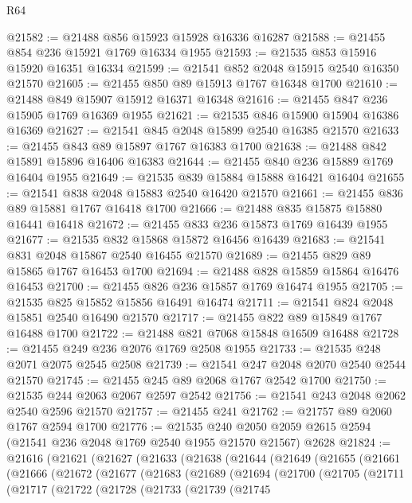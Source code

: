 \begin{lexlean}{R64}
\begin{coremodule}
@21582 := @21488 @856 @15923 @15928 @16336 @16287
@21588 := @21455 @854 @236 @15921 @1769 @16334 @1955
@21593 := @21535 @853 @15916 @15920 @16351 @16334
@21599 := @21541 @852 @2048 @15915 @2540 @16350 @21570
@21605 := @21455 @850 @89 @15913 @1767 @16348 @1700
@21610 := @21488 @849 @15907 @15912 @16371 @16348
@21616 := @21455 @847 @236 @15905 @1769 @16369 @1955
@21621 := @21535 @846 @15900 @15904 @16386 @16369
@21627 := @21541 @845 @2048 @15899 @2540 @16385 @21570
@21633 := @21455 @843 @89 @15897 @1767 @16383 @1700
@21638 := @21488 @842 @15891 @15896 @16406 @16383
@21644 := @21455 @840 @236 @15889 @1769 @16404 @1955
@21649 := @21535 @839 @15884 @15888 @16421 @16404
@21655 := @21541 @838 @2048 @15883 @2540 @16420 @21570
@21661 := @21455 @836 @89 @15881 @1767 @16418 @1700
@21666 := @21488 @835 @15875 @15880 @16441 @16418
@21672 := @21455 @833 @236 @15873 @1769 @16439 @1955
@21677 := @21535 @832 @15868 @15872 @16456 @16439
@21683 := @21541 @831 @2048 @15867 @2540 @16455 @21570
@21689 := @21455 @829 @89 @15865 @1767 @16453 @1700
@21694 := @21488 @828 @15859 @15864 @16476 @16453
@21700 := @21455 @826 @236 @15857 @1769 @16474 @1955
@21705 := @21535 @825 @15852 @15856 @16491 @16474
@21711 := @21541 @824 @2048 @15851 @2540 @16490 @21570
@21717 := @21455 @822 @89 @15849 @1767 @16488 @1700
@21722 := @21488 @821 @7068 @15848 @16509 @16488
@21728 := @21455 @249 @236 @2076 @1769 @2508 @1955
@21733 := @21535 @248 @2071 @2075 @2545 @2508
@21739 := @21541 @247 @2048 @2070 @2540 @2544 @21570
@21745 := @21455 @245 @89 @2068 @1767 @2542 @1700
@21750 := @21535 @244 @2063 @2067 @2597 @2542
@21756 := @21541 @243 @2048 @2062 @2540 @2596 @21570
@21757 := @21455 @241
@21762 := @21757 @89 @2060 @1767 @2594 @1700
@21776 := @21535
    @240
    @2050
    @2059
    @2615
    @2594
    (@21541 @236 @2048 @1769 @2540 @1955 @21570 @21567)
    @2628
@21824 := @21616
    (@21621
      (@21627
        (@21633
          (@21638
            (@21644
              (@21649
                (@21655
                  (@21661
                    (@21666
                      (@21672
                        (@21677
                          (@21683
                            (@21689
                              (@21694
                                (@21700
                                  (@21705
                                    (@21711
                                      (@21717
                                        (@21722
                                          (@21728
                                            (@21733
                                              (@21739
                                                (@21745

\end{coremodule}
\end{lexlean}
